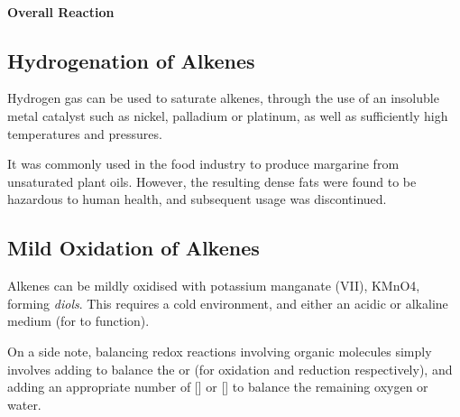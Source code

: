 			\paragraph{Overall Reaction}








	\pagebreak
	\subsection{Hydrogenation of Alkenes}

		Hydrogen gas can be used to saturate alkenes, through the use of an insoluble metal catalyst such as nickel, palladium or platinum,
		as well as sufficiently high temperatures and pressures.

		It was commonly used in the food industry to produce margarine from unsaturated plant oils. However, the resulting dense fats were
		found to be hazardous to human health, and subsequent usage was discontinued.






	\pagebreak
	\subsection{Mild Oxidation of Alkenes}

		Alkenes can be mildly oxidised with potassium manganate (VII), KMnO4, forming \textit{diols}. This requires a cold environment,
		and either an acidic or alkaline medium (for  to function).

		On a side note, balancing redox reactions involving organic molecules simply involves adding  to balance the
		 or  (for oxidation and reduction respectively), and adding an appropriate number of [] or []
		to balance the remaining oxygen or water.


